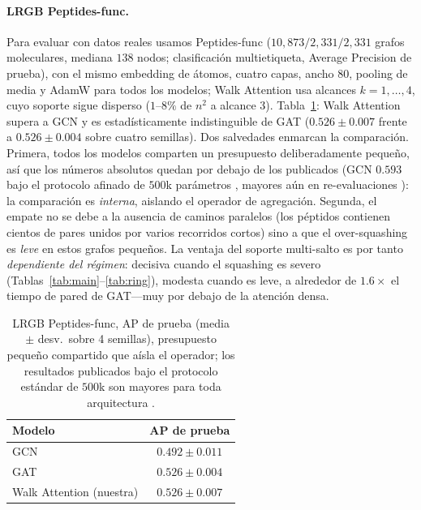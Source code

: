 \documentclass[runningheads]{llncs}
\begin{document}
\paragraph{LRGB Peptides-func.}
Para evaluar con datos reales usamos Peptides-func \cite{dwivedi2022lrgb}
($10{,}873/2{,}331/2{,}331$ grafos moleculares, mediana $138$ nodos;
clasificación multietiqueta, Average Precision de prueba), con el mismo
embedding de átomos, cuatro capas, ancho $80$, pooling de media y AdamW para
todos los modelos; Walk Attention usa alcances $k=1,\dots,4$, cuyo soporte
sigue disperso ($1$--$8\%$ de $n^2$ a alcance $3$). Tabla~\ref{tab:lrgb}: Walk
Attention supera a GCN y es estadísticamente indistinguible de GAT
($0.526\pm0.007$ frente a $0.526\pm0.004$ sobre cuatro semillas). Dos
salvedades enmarcan la comparación. Primera, todos los modelos comparten un
presupuesto deliberadamente pequeño, así que los números absolutos quedan por
debajo de los publicados (GCN $0.593$ bajo el protocolo afinado de $500$k
parámetros \cite{dwivedi2022lrgb}, mayores aún en re-evaluaciones
\cite{tonshoff2023where}): la comparación es \emph{interna}, aislando el
operador de agregación. Segunda, el empate no se debe a la ausencia de caminos
paralelos (los péptidos contienen cientos de pares unidos por varios recorridos
cortos) sino a que el over-squashing es \emph{leve} en estos grafos pequeños.
La ventaja del soporte multi-salto es por tanto \emph{dependiente del régimen}:
decisiva cuando el squashing es severo
(Tablas~\ref{tab:main}--\ref{tab:ring}), modesta cuando es leve, a alrededor de
$1.6\times$ el tiempo de pared de GAT---muy por debajo de la atención densa.

\begin{table}[t]
\centering
\caption{LRGB Peptides-func, AP de prueba (media $\pm$ desv.\ sobre 4
semillas), presupuesto pequeño compartido que aísla el operador; los resultados
publicados bajo el protocolo estándar de $500$k son mayores para toda
arquitectura \cite{dwivedi2022lrgb,tonshoff2023where}.}
\label{tab:lrgb}
\begin{tabular}{lc}
\toprule
\textbf{Modelo} & \textbf{AP de prueba} \\
\midrule
GCN                          & $0.492\pm0.011$ \\
GAT                          & $0.526\pm0.004$ \\
Walk Attention (nuestra)        & $0.526\pm0.007$ \\
\bottomrule
\end{tabular}
\end{table}
\end{document}
